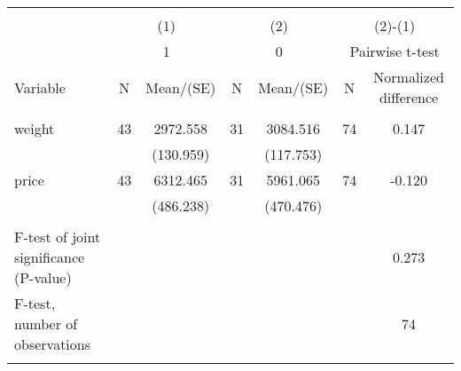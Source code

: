 
\begin{tabular}{@{\extracolsep{5pt}}lcccccc}
\\[-1.8ex]\hline \hline \\[-1.8ex]
 & \multicolumn{2}{c}{(1)}  & \multicolumn{2}{c}{(2)}  & \multicolumn{2}{c}{(2)-(1)} \\
 & \multicolumn{2}{c}{1}  & \multicolumn{2}{c}{0}  & \multicolumn{2}{c}{Pairwise t-test}  \\
Variable & N & Mean/(SE) & N & Mean/(SE) & N & Normalized difference \\ \hline \\[-1.8ex] 
weight   & 43    & 2972.558    & 31    & 3084.516    & 74    & 0.147   \\
 &   & (130.959)  &   & (117.753)  &   &  \\ [1ex]
price   & 43    & 6312.465    & 31    & 5961.065    & 74    & -0.120   \\
 &   & (486.238)  &   & (470.476)  &   &  \\ [1ex]
\hline \\[-1.8ex]
F-test of joint significance (P-value) & &   & &     & &  0.273  \\
F-test, number of observations & &   & &   & &  74  \\
\hline \hline \\[-1.8ex]

\end{tabular}
